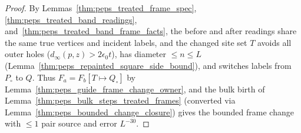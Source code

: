 \begin{proof}\leanok
    By Lemmas~\ref{thm:peps_treated_frame_spec}, \ref{thm:peps_treated_band_readings}, and~\ref{thm:peps_treated_band_frame_facts}, the before and after readings share the same true vertices and incident labels, and the changed site set $T$ avoids all outer holes ($d_\infty(p,z)>2\epsilon_0t$), has diameter $\le n\le L$ (Lemma~\ref{thm:peps_repainted_square_side_bound}), and switches labels from $P_\circ$ to $Q$. Thus $F_a=F_b[T\mapsto Q_\circ]$ by Lemma~\ref{thm:peps_guide_frame_change_owner}, and the bulk birth of Lemma~\ref{thm:peps_bulk_steps_treated_frames} (converted via Lemma~\ref{thm:peps_bounded_change_closure}) gives the bounded frame change with $\le1$ pair source and error $L^{-30}$.
\end{proof}

